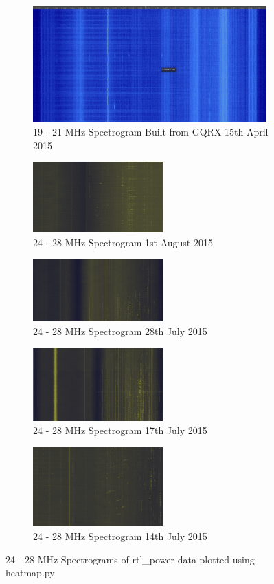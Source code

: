 %
\begin{figure}
	\centering
	\begin{subfigure}[t]{9cm}
		\centering
		\includegraphics[width=9cm]{images/51}
		\caption{19 - 21 MHz Spectrogram Built from GQRX 15th April 2015}
		\label{fig:gqrx_spectrogram_01} 
	\end{subfigure}
	\quad
	\begin{subfigure}[t]{5cm}
		\centering
		\includegraphics[width=5cm]{images/80}
		\caption{24 - 28 MHz Spectrogram 1st August 2015}
		\label{fig:rtl_power_spectrogram_01} 
	\end{subfigure}
	\quad
	\begin{subfigure}[t]{5cm}
		\centering
		\includegraphics[width=5cm]{images/77}
		\caption{24 - 28 MHz Spectrogram 28th July 2015}
		\label{fig:rtl_power_spectrogram_02} 
	\end{subfigure}
	\quad
	\begin{subfigure}[t]{5cm}
		\centering
		\includegraphics[width=5cm]{images/78}
		\caption{24 - 28 MHz Spectrogram 17th July 2015}
		\label{fig:rtl_power_spectrogram_03} 
	\end{subfigure}
	\quad
	\begin{subfigure}[t]{5cm}
		\centering
		\includegraphics[width=5cm]{images/79}
		\caption{24 - 28 MHz Spectrogram 14th July 2015}
		\label{fig:rtl_power_spectrogram_04} 
	\end{subfigure}
	\quad

	\caption{24 - 28 MHz Spectrograms of rtl\_power data plotted using heatmap.py}
	\label{fig:rtl_power_spectrogram}
\end{figure}
